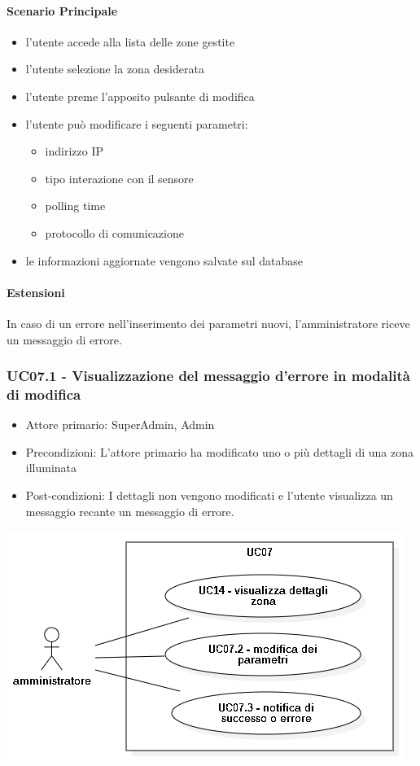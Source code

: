 \documentclass[12pt]{article}
\begin{document}
\paragraph{Scenario Principale}
\begin{itemize}
	\item l'utente accede alla lista delle zone gestite
	\item l'utente selezione la zona desiderata
	\item l'utente preme l'apposito pulsante di modifica
	\item l'utente può modificare i seguenti parametri:
		\begin{itemize}
			\item indirizzo IP
			\item tipo interazione con il sensore
			\item polling time
			\item protocollo di comunicazione
		\end{itemize}
	\item le informazioni aggiornate vengono salvate sul database
\end{itemize}
\paragraph{Estensioni} In caso di un errore nell'inserimento dei parametri nuovi, l'amministratore riceve un messaggio di errore.

\subsubsection{UC07.1 - Visualizzazione del messaggio d'errore in modalità di modifica}
\begin{itemize}
	\item Attore primario: SuperAdmin, Admin
	\item Precondizioni: L'attore primario ha modificato uno o più dettagli di una zona illuminata
	\item Post-condizioni: I dettagli non vengono modificati e l'utente visualizza un messaggio recante un messaggio di errore.
\end{itemize}

\includegraphics[scale=0.5]{UC07.png}
\end{document}
